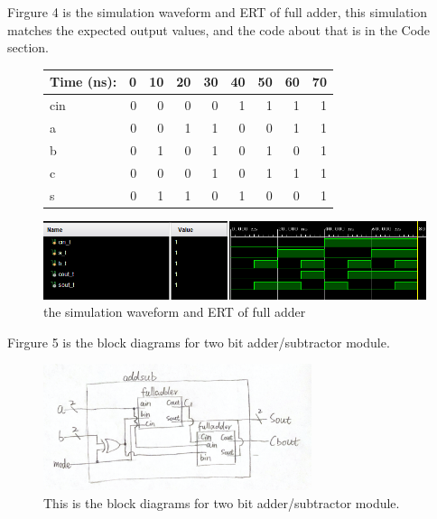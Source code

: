 \documentclass[11pt]{article}
\begin{document}
Firgure 4 is the simulation waveform and ERT of full adder, this simulation matches the expected output values, and the code about that is in the Code section. \\
\begin{figure}[ht]\centering
	\begin{tabular}{l|rrrr|rrrr}
		Time (ns): & 0 & 10 & 20 & 30 & 40 & 50 & 60 & 70\\
		\midrule
		cin & 0 & 0 & 0 & 0 & 1 & 1 & 1 & 1 \\
		a & 0 & 0 & 1 & 1 & 0 & 0 & 1 & 1 \\
		b & 0 & 1 & 0 & 1 & 0 & 1 & 0 & 1 \\
		\midrule
		c & 0 & 0 & 0 & 1 & 0 & 1 & 1 & 1 \\
		s & 0 & 1 & 1 & 0 & 1 & 0 & 0 & 1\\
		\bottomrule
	\end{tabular}\medskip
		
	\includegraphics[width=1\textwidth]{FullAdderSimulation}
	\caption{the simulation waveform and ERT of full adder}
	\label{fig:FullAdderSimulation}
\end{figure}

Firgure 5 is the block diagrams for two bit adder/subtractor module. \\
\begin{figure}[ht]\centering    
	\includegraphics[width=0.7\textwidth]{addsub}    
	\caption{This is the block diagrams for two bit adder/subtractor module.}    
	\label{fig:addsub}
\end{figure}
\end{document}
